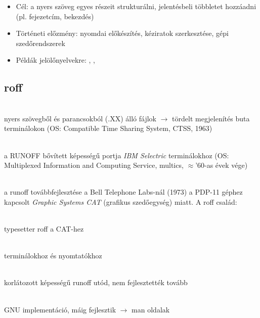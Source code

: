 \begin{frame}
  \begin{itemize}
    \item Cél: a nyers szöveg egyes részeit strukturálni, jelentésbeli többletet hozzáadni (pl. fejezetcím, bekezdés)
    \item Történeti előzmény: nyomdai előkészítés, kéziratok szerkesztése, gépi szedőrendszerek
    \item Példák jelölőnyelvekre: 
      , 
      , 
  \end{itemize}
\end{frame}

\subsection{roff}

\begin{frame}
  \footnotesize
  \begin{description}[m]
    \item[RUNOFF] \hfill \\ nyers szövegből és parancsokból (.XX) álló fájlok $\to$ tördelt megjelenítés buta terminálokon (OS: Compatible Time Sharing System, CTSS, 1963)
    \item[runoff] \hfill \\ a RUNOFF bővített képességű portja \emph{IBM Selectric} terminálokhoz (OS: Multiplexed Information and Computing Service, multics, $\approx$'60-as évek vége)
    \item[roff] \hfill \\ a runoff továbbfejlesztése a Bell Telephone Labs-nál (1973) a PDP-11 géphez kapcsolt \emph{Graphic Systems CAT} (grafikus szedőegység) miatt. A roff család:
    \begin{description}[m]
      \item[troff] \hfill \\ typesetter roff a CAT-hez
      \item[nroff] \hfill \\ terminálokhoz és nyomtatókhoz
      \item[roff] \hfill \\ korlátozott képességű runoff utód, nem fejlesztették tovább
    \end{description}
    \item[groff] \hfill \\ GNU implementáció, máig fejlesztik $\to$ man oldalak
  \end{description}
\end{frame}

